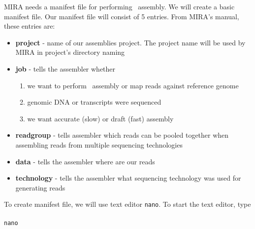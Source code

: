 MIRA needs a manifest file for performing \denovo~assembly.
We will create a basic manifest file. 
Our manifest file will consist of 5 entries. From MIRA's manual, these entries are:
\begin{itemize}
  \item \textbf{project} - name of our assemblies project. The project name will be used by MIRA in project's directory naming
  \item \textbf{job} -  tells the assembler whether
  \begin{enumerate}
    \item we want to perform \denovo~assembly or map reads against reference genome
    \item genomic DNA or transcripts were sequenced
    \item we want accurate (slow) or draft (fast) assembly
  \end{enumerate}
  \item \textbf{readgroup} - tells assembler which reads can be pooled together when assembling reads from multiple sequencing technologies
  \item \textbf{data} - tells the assembler where are our reads
  \item \textbf{technology} - tells the assembler what sequencing technology was used for generating reads
\end{itemize}
To create manifest file, we will use text editor \texttt{nano}. To start the text editor, type \\~\\
\texttt{nano}\\

